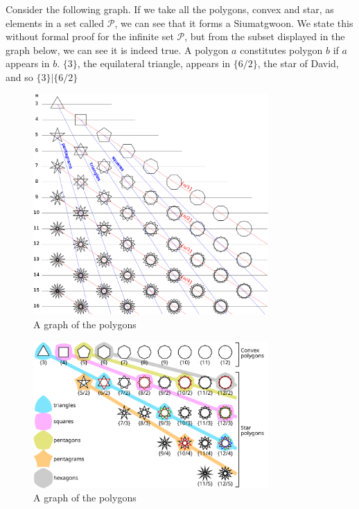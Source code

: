 Consider the following graph. If we take all the polygons, convex and star, as elements in a set called $\mathcal{P}$, we can see that it forms a Siumatgwoon. We state this without formal proof for the infinite set $\mathcal{P}$, but from the subset displayed in the graph below, we can see it is indeed true. A polygon $a$ constitutes polygon $b$ if $a$ appears in $b$. $\{3\}$, the equilateral triangle, appears in $\{6/2\}$, the star of David, and so $\{3\} |\{6/2\}$



\begin{figure}[!htbp]
    \centering
    \includegraphics[width=0.8\textwidth]{images/polygons_1.png}
    \caption{A graph of the polygons}
\end{figure}
\begin{figure}[!htbp]
    \centering
    \includegraphics[width=0.8\textwidth]{images/polygons_2.png}
    \caption{A graph of the polygons}
\end{figure}


